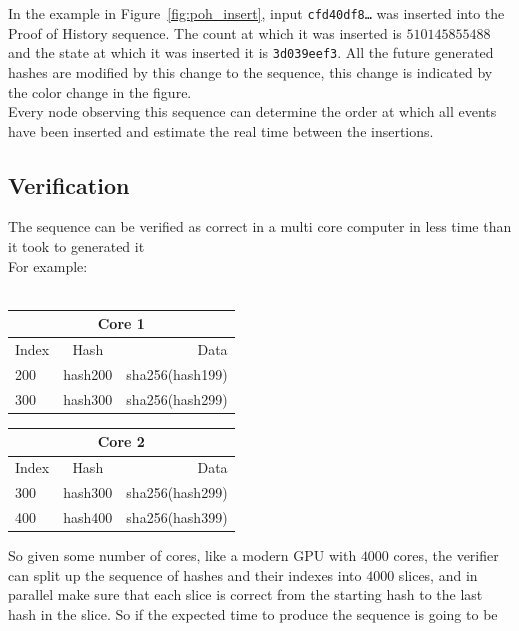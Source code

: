 \documentclass[12pt]{article}
\begin{document}
  In the example in Figure~\ref{fig:poh_insert}, input \texttt{cfd40df8\ldots} was inserted into the Proof of History sequence. The count at which it was inserted is $510145855488$ and the state at which it was inserted it is \texttt{3d039eef3}.  All the future generated hashes are modified by this change to the sequence, this change is indicated by the color change in the figure.\\

Every node observing this sequence can determine the order at which all events have been inserted and estimate the real time between the insertions.

\subsection{Verification}\label{poh:verify}
The sequence can be verified as correct in a multi core computer in less time than it took to generated it \\

\noindent For example: \\\\\noindent
\begin{center}
  \begin{tabular}{ | l | c | r |}
    \hline
    \multicolumn{3}{|c|}{Core 1} \\
    \hline
    Index & Hash & Data \\ \hline
    200 & hash200 & sha256(hash199) \\ \hline
    300 & hash300 & sha256(hash299) \\ \hline
    \end{tabular}
  \begin{tabular}{ | l | c | r |}
    \hline
    \multicolumn{3}{|c|}{Core 2} \\
    \hline
    Index & Hash & Data \\ \hline
    300 & hash300 & sha256(hash299) \\ \hline
    400 & hash400 & sha256(hash399) \\ \hline
    \end{tabular}
\end{center}


So given some number of cores, like a modern GPU with $4000$ cores, the verifier can split up the sequence of hashes and their indexes into $4000$ slices, and in parallel make sure that each slice is correct from the starting hash to the last hash in the slice. So if the expected time to produce the sequence is going to be\\
\end{document}
